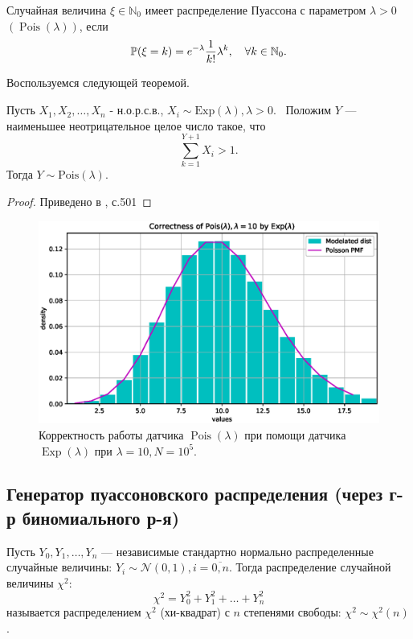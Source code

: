 \documentclass[11pt]{report}
\DeclareMathOperator{\Exp}{Exp}
\DeclareMathOperator{\Pois}{Pois}
\begin{document}
\begin{definition}
Случайная величина $\xi\in\mathbb{N}_0$ имеет распределение Пуассона с параметром $\lambda>0$ $(\Pois(\lambda))$, если
$$
\mathbb{P}(\xi = k) = e^{-\lambda}\dfrac{1}{k!}\lambda^k,\quad \forall k\in\mathbb{N}_0.
$$
\end{definition}

Воспользуемся следующей теоремой.

\begin{theorem} Пусть $X_1,X_2,\dots,X_n$ - н.о.р.с.в., $X_i\sim\mathrm{Exp}(\lambda),\lambda>0$. \
Положим $Y$ --- наименьшее неотрицательное целое число такое, что
$$
\sum_{k=1}^{Y+1}X_i > 1.
$$
Тогда $Y\sim\mathrm{Pois}(\lambda)$.
\end{theorem}
\begin{proof}
Приведено в \cite{devroye}, с.501
\end{proof}

\begin{figure}[H]
    \centering
    \includegraphics[width=0.9\linewidth]{images/poisson-expo.eps}
    \caption{Корректность работы датчика $\Pois(\lambda)$ при помощи датчика $\Exp(\lambda)$ при $\lambda=10,N=10^5$.}
    \label{fig:poisson-expo}
\end{figure}

\subsection{Генератор пуассоновского распределения (через г-р биномиального р-я)}

\begin{definition}
Пусть $Y_0,Y_1,\dots,Y_n$ --- независимые стандартно нормально распределенные случайные величины: $Y_i\sim\mathcal{N}(0,1),i=\overline{0,n}$. Тогда распределение случайной величины $\chi^2$:
$$
\chi^2 = Y_0^2 + Y_1^2 + \dots + Y_n^2
$$
называется распределением $\chi^2$ (хи-квадрат) с $n$ степенями свободы: $\chi^2\sim\chi^2(n)$.
\end{definition}
\end{document}
